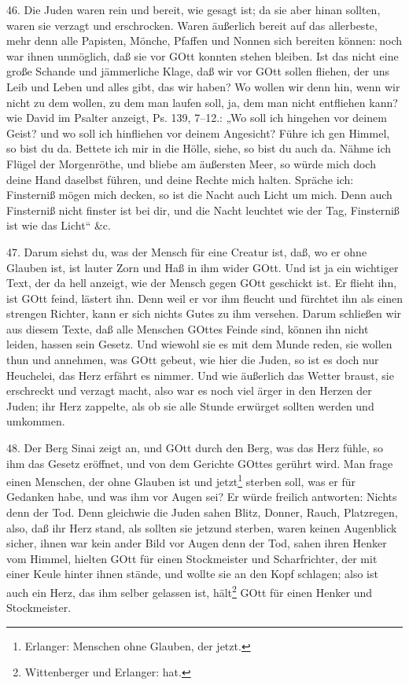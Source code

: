 46. Die Juden waren rein und bereit, wie gesagt ist; da sie aber hinan sollten, waren sie verzagt und erschrocken. Waren äußerlich bereit auf das allerbeste, mehr denn alle Papisten, Mönche, Pfaffen und Nonnen sich bereiten können: noch war ihnen unmöglich, daß sie vor GOtt konnten stehen bleiben. Ist das nicht eine große Schande und jämmerliche Klage, daß wir vor GOtt sollen fliehen, der uns Leib und Leben und alles gibt, das wir haben? Wo wollen wir denn hin, wenn wir nicht zu dem wollen, zu dem man laufen soll, ja, dem man nicht entfliehen kann? wie David im Psalter anzeigt, Ps. 139, 7–12.: „Wo soll ich hingehen vor deinem Geist? und wo soll ich hinfliehen vor deinem Angesicht? Führe ich gen Himmel, so bist du da. Bettete ich mir in die Hölle, siehe, so bist du auch da. Nähme ich Flügel der Morgenröthe, und bliebe am äußersten Meer, so würde mich doch deine Hand daselbst führen, und deine Rechte mich halten. Spräche ich: Finsterniß mögen mich decken, so ist die Nacht auch Licht um mich. Denn auch Finsterniß nicht finster ist bei dir, und die Nacht leuchtet wie der Tag, Finsterniß ist wie das Licht“ \&c.

47. Darum siehst du, was der Mensch für
eine Creatur ist, daß, wo er ohne Glauben ist, ist lauter Zorn und Haß in ihm wider GOtt. Und ist ja ein wichtiger Text, der da hell anzeigt, wie der Mensch gegen GOtt geschickt ist. Er flieht ihn, ist GOtt feind, lästert ihn. Denn weil er vor ihm fleucht und fürchtet ihn als einen strengen Richter, kann er sich nichts Gutes zu ihm versehen. Darum schließen wir aus diesem Texte, daß alle Menschen GOttes Feinde sind, können ihn nicht leiden, hassen sein Gesetz. Und wiewohl sie es mit dem Munde reden, sie wollen thun und annehmen, was GOtt gebeut, wie hier die Juden, so ist es doch nur Heuchelei, das Herz erfährt es nimmer. Und wie äußerlich das Wetter braust, sie erschreckt und verzagt macht, also war es noch viel ärger in den Herzen der Juden; ihr Herz zappelte, als ob sie alle Stunde erwürget sollten werden und umkommen.

48. Der Berg Sinai zeigt an, und GOtt durch den Berg, was das Herz fühle, so ihm das Gesetz eröffnet, und von dem Gerichte GOttes gerührt wird. Man frage einen Menschen, der ohne Glauben ist und jetzt\footnote{Erlanger: Menschen ohne Glauben, der jetzt.} sterben soll, was er für Gedanken habe, und was ihm vor Augen sei? Er würde freilich antworten: Nichts denn der Tod. Denn gleichwie die Juden sahen Blitz, Donner, Rauch, Platzregen, also, daß ihr Herz stand, als sollten sie jetzund sterben, waren keinen Augenblick sicher, ihnen war kein ander Bild vor Augen denn der Tod, sahen ihren Henker vom Himmel, hielten GOtt für einen Stockmeister und Scharfrichter, der mit einer Keule hinter ihnen stände, und wollte sie an den Kopf schlagen; also ist auch ein Herz, das ihm selber gelassen ist, hält\footnote{Wittenberger und Erlanger: hat.} GOtt für einen Henker und Stockmeister.

